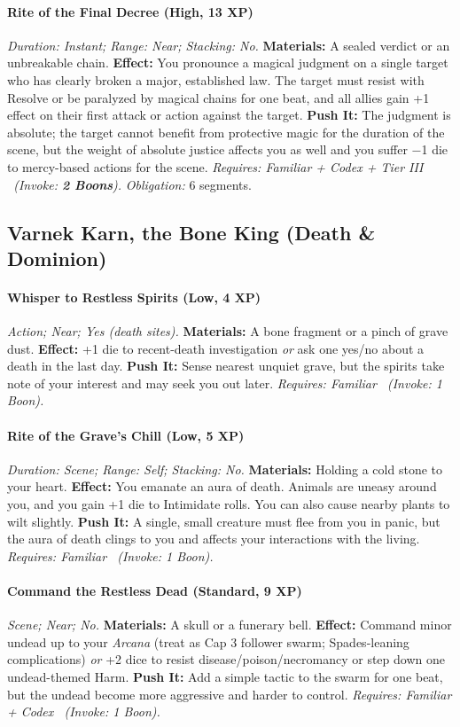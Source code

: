 \documentclass[12pt,twoside]{book}
\begin{document}
\paragraph{Rite of the Final Decree (High, 13 XP)} \emph{Duration: Instant; Range: Near; Stacking: No.}
\textbf{Materials:} A sealed verdict or an unbreakable chain.
\textbf{Effect:} You pronounce a magical judgment on a single target who has clearly broken a major, established law. The target must resist with Resolve or be paralyzed by magical chains for one beat, and all allies gain +1 effect on their first attack or action against the target.
\textbf{Push It:} The judgment is absolute; the target cannot benefit from protective magic for the duration of the scene, but the weight of absolute justice affects you as well and you suffer −1 die to mercy-based actions for the scene.
\emph{Requires: Familiar + Codex + Tier III \ (\textit{Invoke:} \textbf{2 Boons}).}
\emph{Obligation:} 6 segments.

\subsection{Varnek Karn, the Bone King (Death \& Dominion)}
\paragraph{Whisper to Restless Spirits (Low, 4 XP)} \emph{Action; Near; Yes (death sites).}
\textbf{Materials:} A bone fragment or a pinch of grave dust.
\textbf{Effect:} +1 die to recent-death investigation \emph{or} ask one yes/no about a death in the last day.
\textbf{Push It:} Sense nearest unquiet grave, but the spirits take note of your interest and may seek you out later.
\emph{Requires: Familiar \ (\textit{Invoke:} 1 Boon).}
\paragraph{Rite of the Grave's Chill (Low, 5 XP)} \emph{Duration: Scene; Range: Self; Stacking: No.}
\textbf{Materials:} Holding a cold stone to your heart.
\textbf{Effect:} You emanate an aura of death. Animals are uneasy around you, and you gain +1 die to Intimidate rolls. You can also cause nearby plants to wilt slightly.
\textbf{Push It:} A single, small creature must flee from you in panic, but the aura of death clings to you and affects your interactions with the living.
\emph{Requires: Familiar \ (\textit{Invoke:} 1 Boon).}
\paragraph{Command the Restless Dead (Standard, 9 XP)} \emph{Scene; Near; No.}
\textbf{Materials:} A skull or a funerary bell.
\textbf{Effect:} Command minor undead up to your \emph{Arcana} (treat as Cap 3 follower swarm; Spades-leaning complications) \emph{or} +2 dice to resist disease/poison/necromancy or step down one undead-themed Harm.
\textbf{Push It:} Add a simple tactic to the swarm for one beat, but the undead become more aggressive and harder to control.
\emph{Requires: Familiar + Codex \ (\textit{Invoke:} 1 Boon).}
\end{document}
